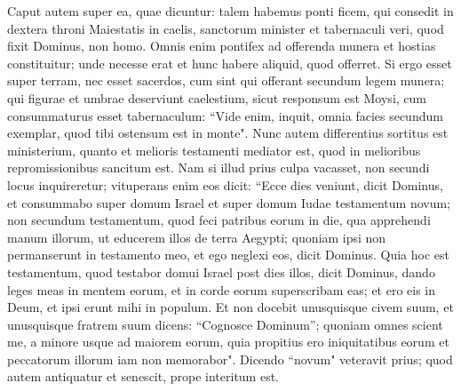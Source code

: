 \begin{biblechapter} 
\verse Caput autem super ea, quae dicuntur: talem habemus ponti ficem, qui consedit in dextera throni Maiestatis in caelis, 
\verse sanctorum minister et tabernaculi veri, quod fixit Dominus, non homo. 
\verse Omnis enim pontifex ad offerenda munera et hostias constituitur; unde necesse erat et hunc habere aliquid, quod offerret. 
\verse Si ergo esset super terram, nec esset sacerdos, cum sint qui offerant secundum legem munera; 
\verse qui figurae et umbrae deserviunt caelestium, sicut responsum est Moysi, cum consummaturus esset tabernaculum: “Vide enim, inquit, omnia facies secundum exemplar, quod tibi ostensum est in monte". 
\verse Nunc autem differentius sortitus est ministerium, quanto et melioris testamenti mediator est, quod in melioribus repromissionibus sancitum est. 
\verse Nam si illud prius culpa vacasset, non secundi locus inquireretur; 
\verse vituperans enim eos dicit: “Ecce dies veniunt, dicit Dominus, et consummabo super domum Israel et super domum Iudae testamentum novum; 
\verse non secundum testamentum, quod feci patribus eorum in die, qua apprehendi manum illorum, ut educerem illos de terra Aegypti; quoniam ipsi non permanserunt in testamento meo, et ego neglexi eos, dicit Dominus. 
\verse Quia hoc est testamentum, quod testabor domui Israel post dies illos, dicit Dominus, dando leges meas in mentem eorum, et in corde eorum superscribam eas; et ero eis in Deum, et ipsi erunt mihi in populum. 
\verse Et non docebit unusquisque civem suum, et unusquisque fratrem suum dicens: “Cognosce Dominum”; quoniam omnes scient me, a minore usque ad maiorem eorum, 
\verse quia propitius ero iniquitatibus eorum et peccatorum illorum iam non memorabor". 
\verse Dicendo “novum" veteravit prius; quod autem antiquatur et senescit, prope interitum est. 
\end{biblechapter}

